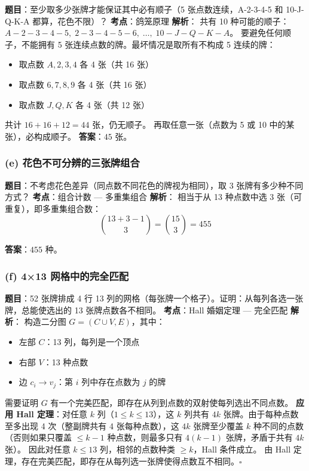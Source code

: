 \documentclass[10pt,a4paper,openany]{ctexbook}
\theoremstyle{definition}
\theoremstyle{remark}
\begin{document}
\textbf{题目}：至少取多少张牌才能保证其中必有顺子（5 张点数连续，A-2-3-4-5 和 10-J-Q-K-A 都算，花色不限）？
\textbf{考点}：鸽笼原理
\textbf{解析}：
共有 10 种可能的顺子：
$A-2-3-4-5,\; 2-3-4-5-6,\; \dots,\; 10-J-Q-K-A$。
要避免任何顺子，不能拥有 5 张连续点数的牌。最坏情况是取所有不构成 5 连续的牌：
\begin{itemize}
\item 取点数 $A, 2, 3, 4$ 各 4 张（共 16 张）
\item 取点数 $6, 7, 8, 9$ 各 4 张（共 16 张）
\item 取点数 $J, Q, K$ 各 4 张（共 12 张）
\end{itemize}

共计 $16 + 16 + 12 = 44$ 张，仍无顺子。
再取任意一张（点数为 5 或 10 中的某张），必构成顺子。
\textbf{答案}：$\boxed{45}$ 张。
\vspace{-2pt}

\subsubsection{(e) 花色不可分辨的三张牌组合}

\textbf{题目}：不考虑花色差异（同点数不同花色的牌视为相同），取 3 张牌有多少种不同方式？
\textbf{考点}：组合计数 — 多重集组合
\textbf{解析}：
相当于从 13 种点数中选 3 张（可重复），即多重集组合数：
\[
 \binom{13 + 3 - 1}{3} = \binom{15}{3} = 455 
\]

\textbf{答案}：$\boxed{455}$ 种。
\vspace{-2pt}

\subsubsection{(f) 4×13 网格中的完全匹配}

\textbf{题目}：52 张牌排成 4 行 13 列的网格（每张牌一个格子）。证明：从每列各选一张牌，总能使选出的 13 张牌点数各不相同。
\textbf{考点}：Hall 婚姻定理 — 完全匹配
\textbf{解析}：
构造二分图 $G = (C \cup V, E)$，其中：
\begin{itemize}
\item 左部 $C$：13 列，每列是一个顶点
\item 右部 $V$：13 种点数
\item 边 $c_i \to v_j$：第 $i$ 列中存在点数为 $j$ 的牌

\end{itemize}

需要证明 $G$ 有一个完美匹配，即存在从列到点数的双射使每列选出不同点数。
\textbf{应用 Hall 定理}：对任意 $k$ 列（$1 \le k \le 13$），这 $k$ 列共有 $4k$ 张牌。由于每种点数至多出现 4 次（整副牌共有 4 张每种点数），这 $4k$ 张牌至少覆盖 $k$ 种不同的点数（否则如果只覆盖 $\le k-1$ 种点数，则最多只有 $4(k-1)$ 张牌，矛盾于共有 $4k$ 张）。
因此对任意 $k \le 13$ 列，相邻的点数种类 $\ge k$，Hall 条件成立。
由 Hall 定理，存在完美匹配，即存在从每列选一张牌使得点数互不相同。$\square$
\vspace{-2pt}
\end{document}
